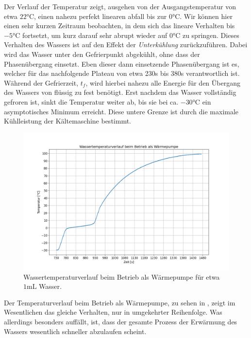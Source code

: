 Der Verlauf der Temperatur zeigt, ausgehen von der Ausgangstemperatur von etwa $22\si{\celsius}$, einen nahezu perfekt linearen abfall bis zur $0\si{\celsius}$. Wir können hier einen sehr kurzen Zeitraum beobachten, in dem sich das lineare Verhalten bis $-5\si{\celsius}$ fortsetzt, um kurz darauf sehr abrupt wieder auf $0\si{\celsius}$ zu springen. Dieses Verhalten des Wassers ist auf den Effekt der \textit{Unterkühlung} zurückzuführen. Dabei wird das Wasser unter den Gefrierpunkt abgekühlt, ohne dass der Phasenübergang einsetzt. Eben dieser dann einsetzende Phasenübergang ist es, welcher für das nachfolgende Plateau von etwa 230s bis 380s verantwortlich ist. Während der Gefrierzeit, $t_f$, wird hierbei nahezu alle Energie für den Übergang des Wassers von flüssig zu fest benötigt. Erst nachdem das Wasser vollständig gefroren ist, sinkt die Temperatur weiter ab, bis sie bei ca. $-30 \si{\celsius}$ ein asymptotisches Minimum erreicht. Diese untere Grenze ist durch die maximale Kühlleistung der Kältemaschine bestimmt. 

\begin{figure}[H]
    \centering
    \includegraphics[width=.9\textwidth]{files/tempverlauf_warm.png}
    \caption{Wassertemperaturverlauf beim Betrieb als Wärmepumpe für etwa $1 \si{\milli\liter}$ Wasser.}
    \label{fig:tempverlauf_warm}
\end{figure}

Der Temperaturverlauf beim Betrieb als Wärmepumpe, zu sehen in , zeigt im Wesentlichen das gleiche Verhalten, nur in umgekehrter Reihenfolge. Was allerdings besonders auffällt, ist, dass der gesamte Prozess der Erwärmung des Wassers wesentlich schneller abzulaufen scheint. 

